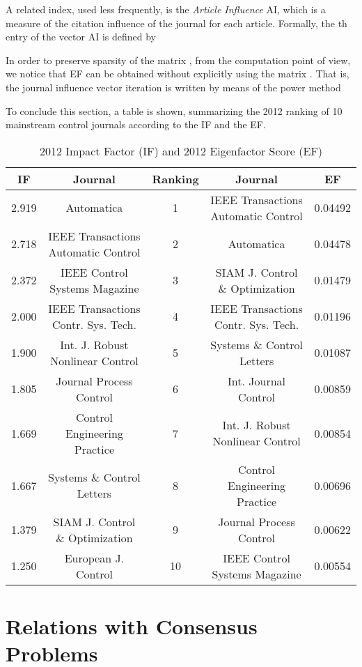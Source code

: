 \documentclass[11pt,draftcls,onecolumn]{IEEEtran}
\begin{document}
A related index, used less frequently, is the {\it Article Influence} AI, 
which is a measure of the citation influence 
of the journal for each article. Formally, 
the th entry of the vector AI is defined by


In order to preserve sparsity of the matrix , from the computation point of view, we notice that 
EF can be obtained without explicitly using the matrix . 
That is, the journal influence 
vector iteration is written by means of the power method 


To conclude this section, a table is shown, summarizing 
the 2012 ranking of 10 mainstream control journals according to the IF and the EF.


\begin{table}[htb]
\caption{2012 Impact Factor (IF) and 2012 Eigenfactor Score (EF)}
\label{IFandEI}
\begin{tabular}{|c|c|c|c|c|} \hline
IF & Journal & Ranking & Journal & EF\\ \hline
2.919 & Automatica & 1 & IEEE Transactions Automatic Control & 0.04492\\
2.718 &IEEE Transactions Automatic Control & 2 & Automatica & 0.04478\\
2.372 &IEEE Control Systems Magazine & 3 & SIAM J. Control \& Optimization &0.01479\\
2.000 &IEEE Transactions Contr. Sys. Tech. & 4 & IEEE Transactions Contr. Sys. Tech. & 0.01196\\
1.900 &Int. J. Robust 
Nonlinear Control & 5 & Systems \& Control Letters &0.01087\\
1.805 &Journal Process Control & 6 & Int. Journal Control &0.00859\\
1.669 & Control Engineering Practice & 7 & Int. J. Robust Nonlinear Control&0.00854\\
1.667 &Systems \& Control Letters & 8 & Control Engineering Practice & 0.00696\\
1.379&SIAM J. Control \& Optimization & 9 & Journal Process Control&0.00622\\
1.250&European J. Control & 10 & IEEE Control Systems Magazine& 0.00554\\
\hline
\end{tabular}
\end{table}



\section*{Relations with Consensus Problems}
\end{document}
